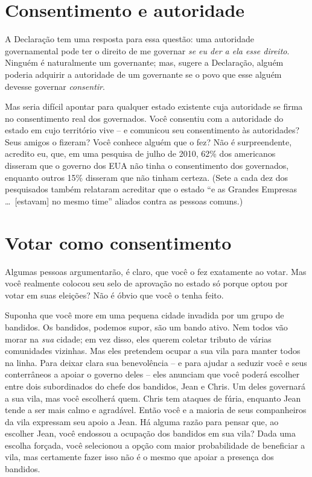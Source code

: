 \section{Consentimento e autoridade}

A Declaração tem uma resposta para essa questão: uma autoridade governamental pode ter o direito de me governar \emph{se eu der a ela esse direito}. Ninguém é naturalmente um governante; mas, sugere a Declaração, alguém poderia adquirir a autoridade de um governante se o povo que esse alguém devesse governar \emph{consentir}.

Mas seria difícil apontar para qualquer estado existente cuja autoridade se firma no consentimento real dos governados. Você consentiu com a autoridade do estado em cujo território vive -- e comunicou seu consentimento às autoridades? Seus amigos o fizeram? Você conhece alguém que o fez? Não é surpreendente, acredito eu, que, em uma pesquisa de julho de 2010, 62\% dos americanos disseram que o governo dos EUA não tinha o consentimento dos governados, enquanto outros 15\% disseram que não tinham certeza. (Sete a cada dez dos pesquisados também relataram acreditar que o estado ``e as Grandes Empresas \ldots\ [estavam] no mesmo time'' aliados contra as pessoas comuns.)

\section{Votar como consentimento}

Algumas pessoas argumentarão, é claro, que você o fez exatamente ao votar. Mas você realmente colocou seu selo de aprovação no estado só porque optou por votar em suas eleições? Não é óbvio que você o tenha feito.

Suponha que você more em uma pequena cidade invadida por um grupo de bandidos. Os bandidos, podemos supor, são um bando ativo. Nem todos vão morar na \emph{sua} cidade; em vez disso, eles querem coletar tributo de várias comunidades vizinhas. Mas eles pretendem ocupar a sua vila para manter todos na linha. Para deixar clara sua benevolência -- e para ajudar a seduzir você e seus conterrâneos a apoiar o governo deles -- eles anunciam que você poderá escolher entre dois subordinados do chefe dos bandidos, Jean e Chris. Um deles governará a sua vila, mas você escolherá quem. Chris tem ataques de fúria, enquanto Jean tende a ser mais calmo e agradável. Então você e a maioria de seus companheiros da vila expressam seu apoio a Jean. Há alguma razão para pensar que, ao escolher Jean, você endossou a ocupação dos bandidos em sua vila? Dada uma escolha forçada, você selecionou a opção com maior probabilidade de beneficiar a vila, mas certamente fazer isso não é o mesmo que apoiar a presença dos bandidos.

